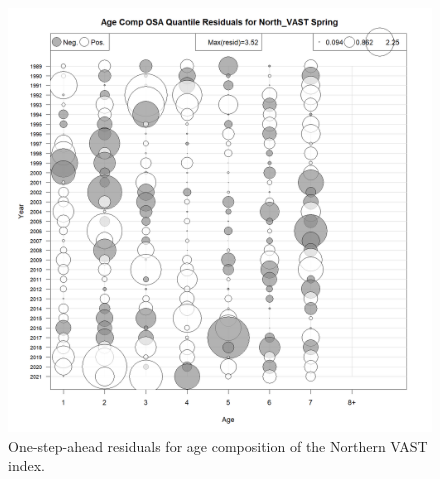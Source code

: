 \documentclass[
]{article}
\begin{document}
\begin{figure}

{\centering \includegraphics[width=1\linewidth]{../2023.RT.Runs/Run34/plots_png/diagnostics/Catch_age_comp_osa_resids_North_VAST_Spring} 

}

\caption{One-step-ahead residuals for age composition of the Northern VAST index.}\label{fig:osa-North-vast-paa}
\end{figure}
\end{document}
